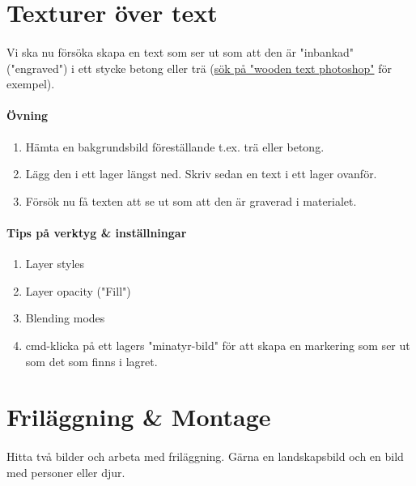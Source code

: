 \documentclass{article}
\begin{document}
  \section{ Texturer över text}
    \paragraph{}
    Vi ska nu försöka skapa en text som ser ut som att den är "inbankad" ("engraved") i ett stycke betong eller trä (\href{https://www.google.se/search?q=engraved+text+photoshop&um=1&ie=UTF-8&hl=sv&tbm=isch&source=og&sa=N&tab=wi&ei=xK4lUsD7DNSQhQep94CYBQ&biw=1280&bih=679&sei=xq4lUuefCMGJhQfghYCoAw#hl=sv&q=wooden+text+photoshop&tbm=isch&um=1}{sök på "wooden text photoshop"} för exempel). 

    \paragraph{Övning}
      \begin{enumerate}
        \item Hämta en bakgrundsbild föreställande t.ex. trä eller betong.
        \item Lägg den i ett lager längst ned. Skriv sedan en text i ett lager ovanför.
        \item Försök nu få texten att se ut som att den är graverad i materialet.
      \end{enumerate}

    \paragraph{Tips på verktyg \& inställningar}
      \begin{enumerate}
        \item Layer styles
        \item Layer opacity ("Fill")
        \item Blending modes
        \item cmd-klicka på ett lagers "minatyr-bild" för att skapa en markering som ser ut som det som finns i lagret.
      \end{enumerate}
  



  \section{Friläggning \& Montage}
    \paragraph{}
    Hitta två bilder och arbeta med friläggning. Gärna en landskapsbild och en bild med personer eller djur.
\end{document}

